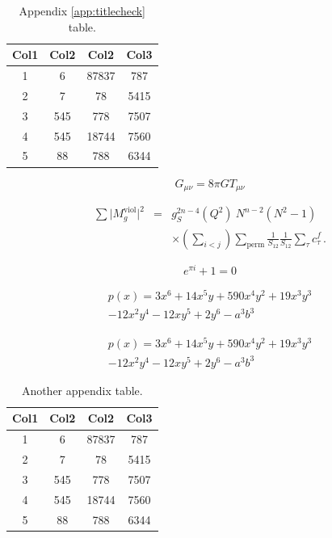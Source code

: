 \begin{table}[b!] %
\caption{Appendix \ref{app:titlecheck} table.}
\label{table:4}
\begin{tabular}{|c c c c|}
 \hline
 Col1 & Col2 & Col2 & Col3 \\ [0.5ex]
 \hline\hline
 1 & 6 & 87837 & 787 \\
 2 & 7 & 78 & 5415 \\
 3 & 545 & 778 & 7507 \\
 4 & 545 & 18744 & 7560 \\
 5 & 88 & 788 & 6344 \\ [1ex]
 \hline
\end{tabular}
\end{table}

\begin{equation}\label{eqb}
G_{\mu \nu }=8\pi GT_{\mu \nu }
\end{equation}

\begin{eqnarray}
  \sum \vert M^{\text{viol}}_g \vert ^2
   &=&  g^{2n-4}_S(Q^2)~N^{n-2} (N^2-1)
\nonumber
\\
   &&   \times \left( \sum_{i<j}\right) \sum_{\text{perm}}
            \frac{1}{S_{12}}  \frac{1}{S_{12}} \sum_\tau c^f_\tau
\,.
\label{eq:multilineeq2}
\end{eqnarray}

\begin{equation} \label{eu_eqn2}
e^{\pi i} + 1 = 0
\end{equation}

\begin{multline*}
p(x) = 3x^6 + 14x^5y + 590x^4y^2 + 19x^3y^3\\
- 12x^2y^4 - 12xy^5 + 2y^6 - a^3b^3
\end{multline*}

\begin{align*}
p(x) = 3x^6 + 14x^5y + 590x^4y^2 + 19x^3y^3\\
- 12x^2y^4 - 12xy^5 + 2y^6 - a^3b^3
\end{align*}

\begin{table}[htb]
\caption{Another appendix table.}
\label{table:5}
\begin{tabular}{|c c c c|}
 \hline
 Col1 & Col2 & Col2 & Col3 \\ [0.5ex]
 \hline\hline
 1 & 6 & 87837 & 787 \\
 2 & 7 & 78 & 5415 \\
 3 & 545 & 778 & 7507 \\
 4 & 545 & 18744 & 7560 \\
 5 & 88 & 788 & 6344 \\ [1ex]
 \hline
\end{tabular}
\end{table}
